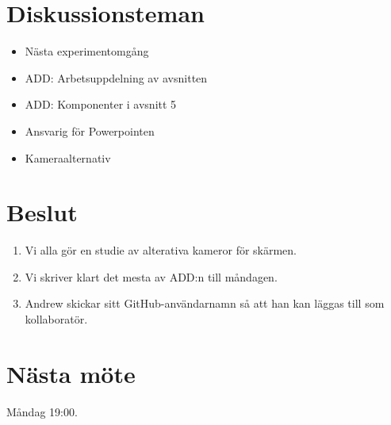 \documentclass[a4paper,12pt]{article}
\begin{document}
\section{Diskussionsteman}
\begin{itemize}
\item Nästa experimentomgång
\item ADD: Arbetsuppdelning av avsnitten
\item ADD: Komponenter i avsnitt 5
\item Ansvarig för Powerpointen
\item Kameraalternativ
\end{itemize}

\section{Beslut}
\begin{enumerate}
\item Vi alla gör en studie av alterativa kameror för skärmen.
\item Vi skriver klart det mesta av ADD:n till måndagen.
\item Andrew skickar sitt GitHub-användarnamn så att han kan läggas till som kollaboratör.
\end{enumerate}

\section{Nästa möte}
Måndag 19:00.
\end{document}
